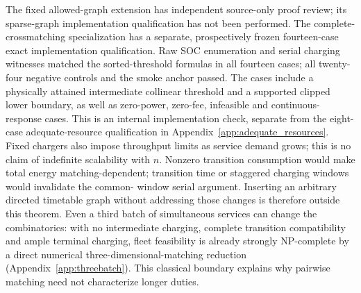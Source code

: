 The fixed allowed-graph extension has independent source-only proof review;
its sparse-graph implementation qualification has not been performed.
The complete-crossmatching specialization has a separate, prospectively
frozen fourteen-case exact implementation qualification. Raw
SOC enumeration and serial charging witnesses matched the sorted-threshold
formulas in all fourteen cases; all twenty-four negative controls and the
smoke anchor passed. The cases include a physically attained intermediate
collinear threshold and a supported clipped lower boundary, as well as
zero-power, zero-fee, infeasible and continuous-response cases. This is an
internal implementation check, separate from the eight-case adequate-resource
qualification in Appendix~\ref{app:adequate_resources}. Fixed chargers also impose throughput limits as service
demand grows; this is no claim of indefinite scalability with $n$.
Nonzero transition consumption would make total energy matching-dependent;
transition time or staggered charging windows would invalidate the common-
window serial argument. Inserting an arbitrary directed timetable graph
without addressing those changes is therefore outside this theorem.
Even a third batch of simultaneous services can change the combinatorics: with no
intermediate charging, complete transition compatibility and ample terminal
charging, fleet feasibility is already strongly NP-complete by a direct
numerical three-dimensional-matching reduction
(Appendix~\ref{app:threebatch}). This classical boundary explains why
pairwise matching need not characterize longer duties.

